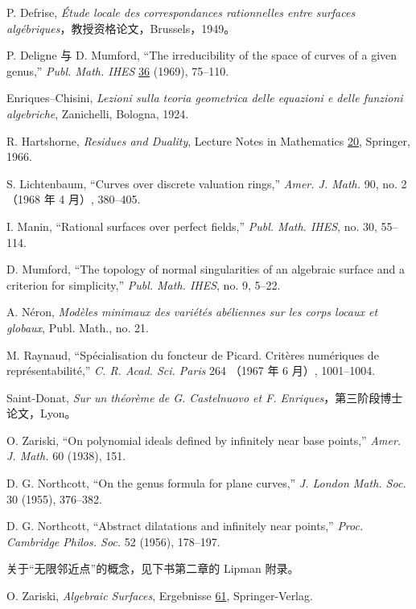 \begin{description}[leftmargin=1.1cm,labelwidth=.8cm,labelsep=.3cm]
\item[{[1]}] P. Defrise, \textit{Étude locale des correspondances rationnelles
entre surfaces algébriques}，教授资格论文，Brussels，1949。

\item[{[2]}] P. Deligne 与 D. Mumford, ``The irreducibility of the space of
curves of a given genus,'' \textit{Publ. Math. IHES} \underline{36} (1969),
75--110.

\item[{[3]}] Enriques--Chisini, \textit{Lezioni sulla teoria geometrica delle
equazioni e delle funzioni algebriche}, Zanichelli, Bologna, 1924.

\item[{[4]}] R. Hartshorne, \textit{Residues and Duality}, Lecture Notes in
Mathematics \underline{20}, Springer, 1966.

\item[{[5]}] S. Lichtenbaum, ``Curves over discrete valuation rings,''
\textit{Amer. J. Math.} 90, no. 2（1968 年 4 月）, 380--405.

\item[{[6]}] I. Manin, ``Rational surfaces over perfect fields,''
\textit{Publ. Math. IHES}, no. 30, 55--114.

\item[{[7]}] D. Mumford, ``The topology of normal singularities of an
algebraic surface and a criterion for simplicity,'' \textit{Publ. Math. IHES},
no. 9, 5--22.

\item[{[8]}] A. Néron, \textit{Modèles minimaux des variétés abéliennes sur
les corps locaux et globaux}, Publ. Math., no. 21.


\item[{[9]}] M. Raynaud, ``Spécialisation du foncteur de Picard. Critères
numériques de représentabilité,'' \textit{C. R. Acad. Sci. Paris} 264
（1967 年 6 月）, 1001--1004.

\item[{[10]}] Saint-Donat, \textit{Sur un théorème de G. Castelnuovo et
F. Enriques}，第三阶段博士论文，Lyon。

\item[{[11]}] O. Zariski, ``On polynomial ideals defined by infinitely near
base points,'' \textit{Amer. J. Math.} 60 (1938), 151.

\item[{[12]}] D. G. Northcott, ``On the genus formula for plane curves,''
\textit{J. London Math. Soc.} 30 (1955), 376--382.

\item[{[13]}] D. G. Northcott, ``Abstract dilatations and infinitely near
points,'' \textit{Proc. Cambridge Philos. Soc.} 52 (1956), 178--197.

\item[] 关于“无限邻近点”的概念，见下书第二章的 Lipman 附录。

\item[{[14]}] O. Zariski, \textit{Algebraic Surfaces}, Ergebnisse
\underline{61}, Springer-Verlag.
\end{description}
